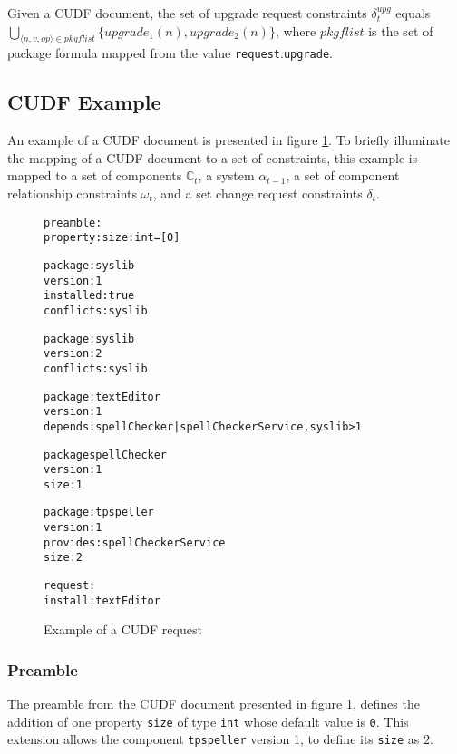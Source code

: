 \begin{defs}
Given a CUDF document, the set of upgrade request constraints $\delta_t^{upg}$ equals $\bigcup \limits_{\langle n,v,op \rangle \in pkgflist} \{upgrade_1(n),upgrade_2(n)\}$, 
where $pkgflist$ is the set of package formula mapped from the value \texttt{request}.\texttt{upgrade}.
\end{defs}


\subsection{CUDF Example}
\label{formal.example}
An example of a CUDF document is presented in figure \ref{formal.CUDFEXAMPLE}.
To briefly illuminate the mapping of a CUDF document to a set of constraints, 
this example is mapped to a set of components $\mathbb{C}_t$, a system $\alpha_{t-1}$, 
a set of component relationship constraints $\omega_t$, 
and a set change request constraints $\delta_t$.

\begin{figure}[htp] 
\begin{center}
\begin{alltt}
preamble:
property: size: int = [0]

package: syslib
version: 1
installed: true
conflicts: syslib

package: syslib
version: 2
conflicts: syslib

package: textEditor
version: 1
depends: spellChecker | spellCheckerService, syslib > 1

package spellChecker
version: 1
size: 1

package: tpspeller
version: 1
provides: spellCheckerService
size: 2

request:
install:textEditor

\end{alltt}
  \caption[CUDF Example]{Example of a CUDF request}
  \label{formal.CUDFEXAMPLE}
\end{center}
\end{figure} 


\subsubsection{Preamble}
The preamble from the CUDF document presented in figure \ref{formal.CUDFEXAMPLE}, 
defines the addition of one property \verb+size+ of type \verb+int+ whose default value is \verb+0+.
This extension allows the component \verb+tpspeller+ version 1, to define its \verb+size+ as $2$.

